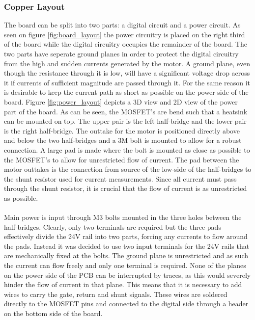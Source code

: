 \subsubsection{Copper Layout} %
\label{ssub:copper_layout}
The board can be split into two parts: a digital circuit and a power circuit.
As seen on figure \ref{fig:board_layout} the power circuitry is placed on the right third of the board while the digital circuitry occupies the remainder of the board.
The two parts have seperate ground planes in order to protect the digital circuitry from the high and sudden currents generated by the motor.
A ground plane, even though the resistance through it is low, will have a significant voltage drop across it if currents of sufficient magnitude are passed through it.
For the same reason it is desirable to keep the current path as short as possible on the power side of the board.
Figure \ref{fig:power_layout} depicts a 3D view and 2D view of the power part of the board.
As can be seen, the MOSFET's are bend such that a heatsink can be mounted on top.
The upper pair is the left half-bridge and the lower pair is the right half-bridge.
The outtake for the motor is positioned directly above and below the two half-bridges and a 3M bolt is mounted to allow for a robust connection.
A large pad is made where the bolt is mounted as close as possible to the MOSFET's to allow for unrestricted flow of current.
The pad between the motor outtakes is the connection from source of the low-side of the half-bridges to the shunt resistor used for current measurements.
Since all current must pass through the shunt resistor, it is crucial that the flow of current is as unrestricted as possible.
\\~\\
Main power is input through M3 bolts mounted in the three holes between the half-bridges.
Clearly, only two terminals are required but the three pads effectively divide the 24V rail into two parts, forcing any currents to flow around the pads.
Instead it was decided to use two input terminals for the 24V rails that are mechanically fixed at the bolts.
The ground plane is unrestricted and as such the current can flow freely and only one terminal is required.
None of the planes on the power side of the PCB can be interrupted by traces, as this would severely hinder the flow of current in that plane.
This means that it is necessary to add wires to carry the gate, return and shunt signals.
These wires are soldered directly to the MOSFET pins and connected to the digital side through a header on the bottom side of the board. 

